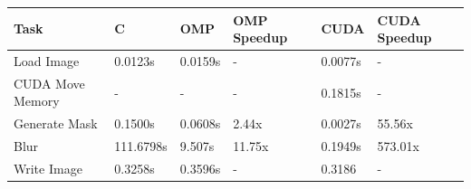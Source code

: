 \documentclass[12pt]{article}
\begin{document}
\begin{tabular}{l|l|l|l|l|l}
    Task & C & OMP & OMP Speedup & CUDA & CUDA Speedup\\
    \hline
    Load Image & 0.0123s & 0.0159s & - & 0.0077s & -\\
    CUDA Move Memory & - & - & - & 0.1815s & -\\
    Generate Mask & 0.1500s & 0.0608s & 2.44x & 0.0027s & 55.56x\\
    Blur & 111.6798s & 9.507s & 11.75x & 0.1949s & 573.01x \\
    Write Image & 0.3258s & 0.3596s & - & 0.3186 & -
\end{tabular}
\end{document}
